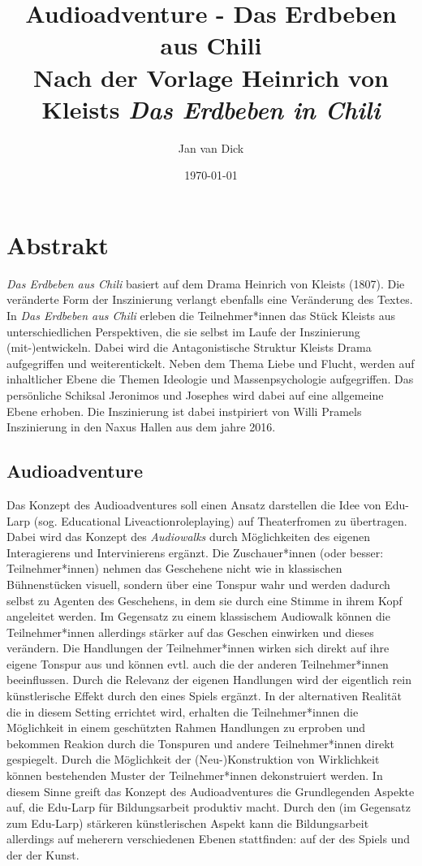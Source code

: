 \documentclass[a4paper, 12pt]{article}
\title{%
    Audioadventure - Das Erdbeben aus Chili \\
    \large Nach der Vorlage Heinrich von Kleists \textit{Das Erdbeben in Chili}}
\author{Jan van Dick}
\date{\today}
\begin{document}
\maketitle

\section{Abstrakt}
\textit{Das Erdbeben aus Chili} basiert auf dem Drama Heinrich von Kleists (1807). 
Die veränderte Form der Inszinierung verlangt ebenfalls eine Veränderung des Textes. 
In \textit{Das Erdbeben aus Chili} erleben die Teilnehmer*innen das Stück Kleists aus unterschiedlichen Perspektiven, die sie selbst im Laufe der Inszinierung (mit-)entwickeln.
Dabei wird die Antagonistische Struktur Kleists Drama aufgegriffen und weiterentickelt. 
Neben dem Thema Liebe und Flucht, werden auf inhaltlicher Ebene die Themen Ideologie und Massenpsychologie aufgegriffen. 
Das persönliche Schiksal Jeronimos und Josephes wird dabei auf eine allgemeine Ebene erhoben.
Die Inszinierung ist dabei instpiriert von Willi Pramels Inszinierung in den Naxus Hallen aus dem jahre 2016.

\subsection{Audioadventure}
Das Konzept des \glqq Audioadventures\grqq{} soll einen Ansatz darstellen die Idee von Edu-Larp (sog. Educational Liveactionroleplaying) auf Theaterfromen zu übertragen. 
Dabei wird das Konzept des \textit{Audiowalks} durch Möglichkeiten des eigenen Interagierens und Intervinierens ergänzt.
Die Zuschauer*innen (oder besser: Teilnehmer*innen) nehmen das Geschehene nicht wie in klassischen Bühnenstücken visuell, sondern über eine Tonspur wahr und werden dadurch selbst zu Agenten des Geschehens, in dem sie durch eine \glqq Stimme in ihrem Kopf\grqq{} angeleitet werden.
Im Gegensatz zu einem \glqq klassischem\grqq{} Audiowalk können die Teilnehmer*innen allerdings stärker auf das Geschen einwirken und dieses verändern. 
Die Handlungen der Teilnehmer*innen wirken sich direkt auf ihre eigene Tonspur aus und können evtl. auch die der anderen Teilnehmer*innen beeinflussen.
Durch die Relevanz der eigenen Handlungen wird der eigentlich rein künstlerische Effekt durch den eines Spiels ergänzt.
In der alternativen Realität die in diesem Setting errichtet wird, erhalten die Teilnehmer*innen die Möglichkeit in einem geschützten Rahmen Handlungen zu erproben und bekommen Reakion durch die Tonspuren und andere Teilnehmer*innen direkt gespiegelt.
Durch die Möglichkeit der (Neu-)Konstruktion von Wirklichkeit können bestehenden Muster der Teilnehmer*innen dekonstruiert werden.
In diesem Sinne greift das Konzept des Audioadventures die Grundlegenden Aspekte auf, die Edu-Larp für Bildungsarbeit produktiv macht.
Durch den (im Gegensatz zum Edu-Larp) stärkeren künstlerischen Aspekt kann die Bildungsarbeit allerdings auf meherern verschiedenen Ebenen stattfinden: auf der des Spiels und der der Kunst. 
\end{document}
